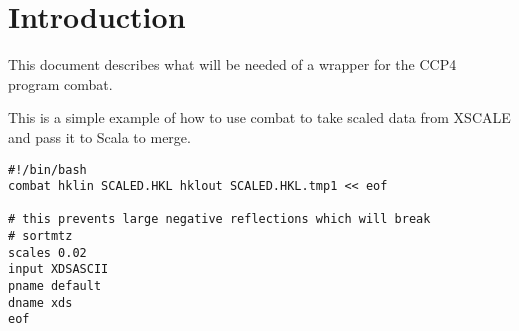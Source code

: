 \documentclass[a4paper, 11pt]{article}
\begin{document}
\section{Introduction}

This document describes what will be needed of a wrapper for the CCP4
program combat.

This is a simple example of how to use combat to take scaled data from 
XSCALE and pass it to Scala to merge.


{
\tiny
\begin{verbatim}
#!/bin/bash
combat hklin SCALED.HKL hklout SCALED.HKL.tmp1 << eof

# this prevents large negative reflections which will break
# sortmtz
scales 0.02
input XDSASCII
pname default
dname xds
eof
\end{verbatim}
}
\end{document}
